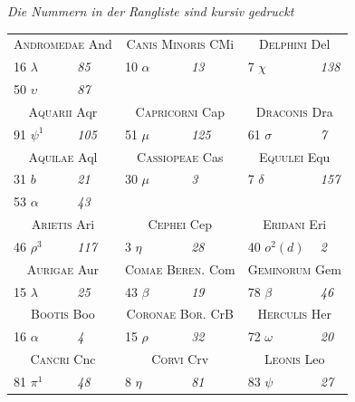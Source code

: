\documentclass[12pt,a4paper]{article}
\theoremstyle{plain}
\theoremstyle{definition}
\theoremstyle{remark}
\begin{document}
\begin{small}
\begin{center}
\textit{Die Nummern in der Rangliste sind kursiv gedruckt}
\end{center}

\begin{center}
\begin{tabular}{ll|ll|ll}
\multicolumn{2}{c}{\textsc{Andromedae} And} &
\multicolumn{2}{c}{\textsc{Canis Minoris} CMi} &
\multicolumn{2}{c}{\textsc{Delphini} Del} \\
16 $\lambda$ & \textit{85} & 10 $\alpha$ & \textit{13} & 7 $\chi$ & \textit{138} \\
50 $\upsilon$ & \textit{87} & & & & \\
\multicolumn{2}{c}{\textsc{Aquarii} Aqr} &
\multicolumn{2}{c}{\textsc{Capricorni} Cap} &
\multicolumn{2}{c}{\textsc{Draconis} Dra} \\
91 $\psi^{1}$ & \textit{105} & 51 $\mu$ & \textit{125} & 61 $\sigma$ & \textit{7} \\
\multicolumn{2}{c}{\textsc{Aquilae} Aql} &
\multicolumn{2}{c}{\textsc{Cassiopeae} Cas} &
\multicolumn{2}{c}{\textsc{Equulei} Equ} \\
31 $b$ & \textit{21} & 30 $\mu$ & \textit{3} & 7 $\delta$ & \textit{157} \\
53 $\alpha$ & \textit{43} & & & & \\
\multicolumn{2}{c}{\textsc{Arietis} Ari} &
\multicolumn{2}{c}{\textsc{Cephei} Cep} &
\multicolumn{2}{c}{\textsc{Eridani} Eri} \\
46 $\rho^{3}$ & \textit{117} & 3 $\eta$ & \textit{28} & 40 $o^{2}(d)$ & \textit{2} \\
\multicolumn{2}{c}{\textsc{Aurigae} Aur} &
\multicolumn{2}{c}{\textsc{Comae Beren.} Com} &
\multicolumn{2}{c}{\textsc{Geminorum} Gem} \\
15 $\lambda$ & \textit{25} & 43 $\beta$ & \textit{19} & 78 $\beta$ & \textit{46} \\
\multicolumn{2}{c}{\textsc{Bootis} Boo} &
\multicolumn{2}{c}{\textsc{Coronae Bor.} CrB} &
\multicolumn{2}{c}{\textsc{Herculis} Her} \\
16 $\alpha$ & \textit{4} & 15 $\rho$ & \textit{32} & 72 $\omega$ & \textit{20} \\
\multicolumn{2}{c}{\textsc{Cancri} Cnc} &
\multicolumn{2}{c}{\textsc{Corvi} Crv} &
\multicolumn{2}{c}{\textsc{Leonis} Leo} \\
81 $\pi^{1}$ & \textit{48} & 8 $\eta$ & \textit{81} & 83 $\psi$ & \textit{27} \\

\end{tabular}
\end{center}
\end{small}
\end{document}
